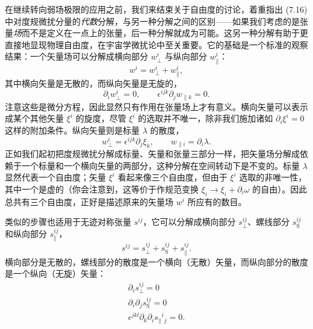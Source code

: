 在继续转向弱场极限的应用之前，我们来结束关于自由度的讨论，着重指出 (7.16) 中对度规微扰分量的\emph{代数}分解，与另一种分解之间的区别——如果我们考虑的是张量\emph{场}而不是定义在一点上的张量，后一种分解就成为可能。这另一种分解有助于更直接地显现物理自由度，在宇宙学微扰论中至关重要。它的基础是一个标准的观察结果：一个矢量场可以分解成横向部分 $w_{\perp}^{i}$ 与纵向部分 $w_{\parallel}^{i}$：
\begin{equation*}
w^{i} = w_{\perp}^{i} + w_{\parallel}^{i},
\tag{7.47}
\end{equation*}
其中横向矢量是无散的，而纵向矢量是无旋的，
\begin{equation*}
\partial_{i}w_{\perp}^{i} = 0, \qquad \epsilon^{ijk}\partial_{j}w_{\parallel k} = 0.
\tag{7.48}
\end{equation*}
注意这些是微分方程，因此显然只有作用在张量场上才有意义。横向矢量可以表示成某个其他矢量 $\xi^{i}$ 的旋度，尽管 $\xi^{i}$ 的选取并不唯一，除非我们施加诸如 $\partial_{i}\xi^{i} = 0$ 这样的附加条件。纵向矢量则是标量 $\lambda$ 的散度，
\begin{equation*}
w_{\perp}^{i} = \epsilon^{ijk}\partial_{j}\xi_{k}, \qquad w_{\parallel i} = \partial_{i}\lambda.
\tag{7.49}
\end{equation*}
正如我们起初把度规微扰分解成标量、矢量和张量三部分一样，把矢量场分解成依赖于一个标量和一个横向矢量的两部分，这种分解在空间转动下是不变的。标量 $\lambda$ 显然代表一个自由度；矢量 $\xi^{i}$ 看起来像三个自由度，但由于 $\xi^{i}$ 选取的非唯一性，其中一个是虚的（你会注意到，这等价于作规范变换 $\xi_{i} \to \xi_{i} + \partial_{i}\omega$ 的自由）。因此总共有三个自由度，正好是描述原来的矢量场 $w^{i}$ 所应有的数目。

类似的步骤也适用于无迹对称张量 $s^{ij}$，它可以分解成横向部分 $s_{\perp}^{ij}$、螺线部分 $s_{\mathrm{S}}^{ij}$ 和纵向部分 $s_{\parallel}^{ij}$，
\begin{equation*}
s^{ij} = s_{\perp}^{ij} + s_{\mathrm{S}}^{ij} + s_{\parallel}^{ij}.
\tag{7.50}
\end{equation*}
横向部分是无散的，螺线部分的散度是一个横向（无散）矢量，而纵向部分的散度是一个纵向（无旋）矢量：
\begin{align*}
\partial_{i}s_{\perp}^{ij} = 0 \\
\partial_{i}\partial_{j}s_{\mathrm{S}}^{ij} = 0 \\
\epsilon^{jkl}\partial_{k}\partial_{i}s_{\parallel}{}^{i}{}_{j} = 0.
\tag{7.51}
\end{align*}

